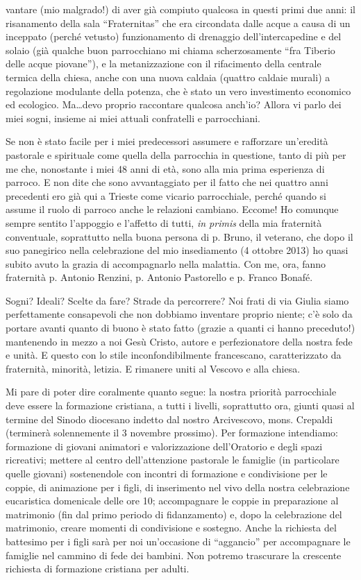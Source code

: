vantare (mio malgrado!) di aver già compiuto qualcosa in questi primi due anni: il risanamento 
della sala ``Fraternitas'' che era circondata dalle acque a causa di un inceppato (perché vetusto) 
funzionamento di drenaggio dell’intercapedine e del solaio (già qualche buon parrocchiano mi 
chiama scherzosamente ``fra Tiberio delle acque piovane''), e la metanizzazione con il rifacimento 
della centrale termica della chiesa, anche con una nuova caldaia (quattro caldaie murali) a 
regolazione modulante della potenza, che è stato un vero investimento economico ed ecologico. 
Ma…devo proprio raccontare qualcosa anch’io? Allora vi parlo dei miei sogni, insieme ai miei 
attuali confratelli e parrocchiani. 

Se non è stato facile per i miei predecessori assumere e rafforzare un’eredità pastorale e 
spirituale come quella della parrocchia in questione, tanto di più per me che, nonostante i miei 48 
anni di età, sono alla mia prima esperienza di parroco. E non dite che sono avvantaggiato per il fatto 
che nei quattro anni precedenti ero già qui a Trieste come vicario parrocchiale, perché quando si 
assume il ruolo di parroco anche le relazioni cambiano. Eccome! Ho comunque sempre sentito 
l’appoggio e l’affetto di tutti, \textit{in primis} della mia fraternità conventuale, soprattutto nella buona 
persona di p. Bruno, il veterano, che dopo il suo panegirico nella celebrazione del mio insediamento 
(4 ottobre 2013) ho quasi subito avuto la grazia di accompagnarlo nella malattia. Con me, ora, 
fanno fraternità p. Antonio Renzini, p. Antonio Pastorello e p. Franco Bonafé. 

Sogni? Ideali? Scelte da fare? Strade da percorrere? Noi frati di via Giulia siamo 
perfettamente consapevoli che non dobbiamo inventare proprio niente; c’è solo da portare avanti 
quanto di buono è stato fatto (grazie a quanti ci hanno preceduto!) mantenendo in mezzo a noi Gesù 
Cristo, autore e perfezionatore della nostra fede e unità. E questo con lo stile inconfondibilmente 
francescano, caratterizzato da fraternità, minorità, letizia. E rimanere uniti al Vescovo e alla chiesa. 

Mi pare di poter dire coralmente quanto segue: la nostra priorità parrocchiale deve essere la 
formazione  cristiana, a tutti i livelli, soprattutto ora, giunti quasi al termine del Sinodo diocesano 
indetto dal nostro Arcivescovo, mons. Crepaldi (terminerà solennemente il 3 novembre prossimo).
Per formazione intendiamo: formazione di giovani animatori e valorizzazione dell’Oratorio e degli 
spazi ricreativi; mettere al centro dell’attenzione pastorale le famiglie (in particolare quelle giovani) 
sostenendole con incontri di formazione e condivisione per le coppie, di animazione per i figli, di 
inserimento nel vivo della nostra celebrazione eucaristica domenicale delle ore 10; accompagnare le 
coppie in preparazione al matrimonio (fin dal primo periodo di fidanzamento) e, dopo la 
celebrazione del matrimonio, creare momenti di condivisione e sostegno. Anche la richiesta del 
battesimo per i figli sarà per noi un’occasione di “aggancio” per accompagnare le famiglie nel 
cammino di fede dei bambini. Non potremo trascurare la crescente richiesta di formazione cristiana 
per adulti.

